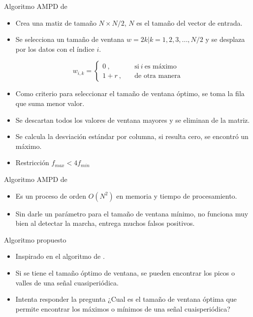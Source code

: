 \documentclass{beamer} %
\begin{document}
\begin{frame}{Algoritmo AMPD de \citep{scholkmann}}
    \begin{itemize}
        \item Crea una matiz de tamaño $N \times N/2$, $N$ es el tamaño del vector de entrada. 
        \item Se selecciona un tamaño de ventana $w = 2k | k = 1,2,3, ..., N/2$ y se desplaza por los datos con el índice $i$.
    \end{itemize}
    \begin{equation}
     w_{i,k} =
    \begin{cases}
    0\ , & \quad \text{si}\ i\ \text{es máximo} \\ 
    1 + r\ , & \quad \text{de otra manera} 
    \end{cases}
    \end{equation}
    \begin{itemize}
        \item Como criterio para seleccionar el tamaño de ventana óptimo, se toma la fila que suma menor valor. 
        \item Se descartan todos los valores de ventana mayores y se eliminan de la matriz. 
        \item Se calcula la desviación estándar por columna, si resulta cero, se encontró un máximo. 
        \item Restricción $f_{max} < 4 f_{min}$
    \end{itemize}
\end{frame}

\begin{frame}{Algoritmo AMPD de \citep{scholkmann}}
    \begin{itemize}
        \item Es un proceso de orden $O(N^2)$ en memoria y tiempo de procesamiento.
        \item Sin darle un parámetro para el tamaño de ventana mínimo, no funciona muy bien al detectar la marcha, entrega muchos falsos positivos. 
    \end{itemize}
\end{frame}

\begin{frame}{Algoritmo propuesto}
    \begin{itemize}
        \item Inspirado en el algoritmo de \cite{scholkmann}.
        \item Si se tiene el tamaño óptimo de ventana, se pueden encontrar los picos o valles de una señal cuasiperiódica.
        \item Intenta responder la pregunta ¿Cual es el tamaño de ventana óptima que permite encontrar los máximos o mínimos de una señal cuaisperiódica?
    \end{itemize}
\end{frame} 



\end{document}
